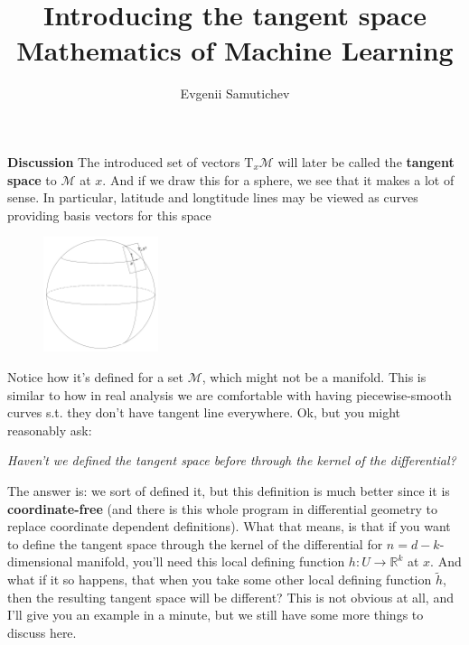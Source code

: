 \documentclass[12pt]{article}
\title{{Introducing the tangent space} \\ \large{Mathematics of Machine Learning}}
\author{Evgenii Samutichev}
\newcommand*{\T}{\mathrm{T}}
\theoremstyle{definition}
\newtheorem{definition}{Definition}[section]
\begin{document}
\maketitle

\setcounter{section}{3}
\setcounter{definition}{13}
\setcounter{theorem}{14}


\noindent \textbf{Discussion} The introduced set of vectors $\T_x \mathcal{M}$ will later be called the \textbf{tangent space} to $\mathcal{M}$ at $x$. And if we draw this for a sphere, we see that it makes a lot of sense. In particular, latitude and longtitude lines may be viewed as curves providing basis vectors for this space 
\begin{figure}[h!]
    \includegraphics[width=0.3\textwidth]{figures/2.png}
    \centering
\end{figure}

Notice how it's defined for a set $\mathcal{M}$, which might not be a manifold. This is similar to how in real analysis we are comfortable with having piecewise-smooth curves s.t. they don't have tangent line everywhere. Ok, but you might reasonably ask: 

\textit{Haven't we defined the tangent space before through the kernel of the differential?} 

The answer is: we sort of defined it, but this definition is much better since it is \textbf{coordinate-free} (and there is this whole program in differential geometry to replace coordinate dependent definitions). What that means, is that if you want to define the tangent space through the kernel of the differential for $n=d-k$-dimensional manifold, you'll need this local defining function $h : U \to \mathbb{R}^k$ at $x$. And what if it so happens, that when you take some other local defining function $\tilde{h}$, then the resulting tangent space will be different? This is not obvious at all, and I'll give you an example in a minute, but we still have some more things to discuss here. 
\end{document}
